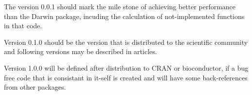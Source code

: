 The version 0.0.1 should mark the mile stone of achieving better performance than the Darwin package, incuding the calculation of not-implemented functions in that code.

Version 0.1.0 should be the version that is distributed to the scientific community and following versions may be described in articles.

Version 1.0.0 will be defined after distribution to CRAN or bioconductor, if a bug free code that is consistant in it-self is created and will have some back-references from other packages.